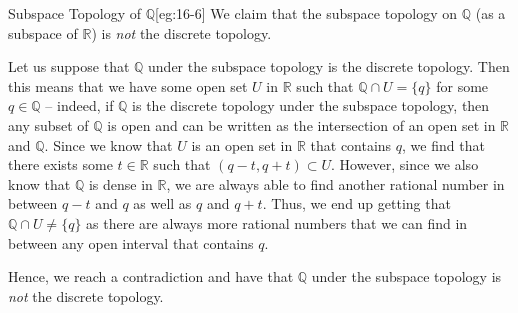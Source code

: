 \begin{egBox}{Subspace Topology of \( \mathbb{Q} \)}[eg:16-6]
    We claim that the subspace topology on \( \mathbb{Q} \) (as a subspace of 
    \( \mathbb{R} \)) is \textit{not} the discrete topology.

    \baseSkip

    Let us suppose that \( \mathbb{Q} \) under the subspace topology is the
    discrete topology.
    Then this means that we have some open set \( U \) in \( \mathbb{R} \) such
    that \( \mathbb{Q} \cap U = \{ q \} \) for some \( q \in \mathbb{Q} \) --
    indeed, if \( \mathbb{Q} \) is the discrete topology under the subspace 
    topology, then any subset of \( \mathbb{Q} \) is open and can be written 
    as the intersection of an open set in \( \mathbb{R} \) and \( \mathbb{Q} \).
    Since we know that \( U \) is an open set in \( \mathbb{R} \) that contains
    \( q \), we find that there exists some \( t \in \mathbb{R} \) such that 
    \( ( q - t, q + t ) \subset U \).
    However, since we also know that \( \mathbb{Q} \) is dense in 
    \( \mathbb{R} \), we are always able to find another rational number in
    between \( q - t \) and \( q \) as well as \( q \) and \( q + t \).
    Thus, we end up getting that \( \mathbb{Q} \cap U \neq \{ q \} \) as there
    are always more rational numbers that we can find in between any open 
    interval that contains \( q \).
    
    \baseSkip 

    Hence, we reach a contradiction and have that \( \mathbb{Q} \) under the 
    subspace topology is \textit{not} the discrete topology.
\end{egBox}